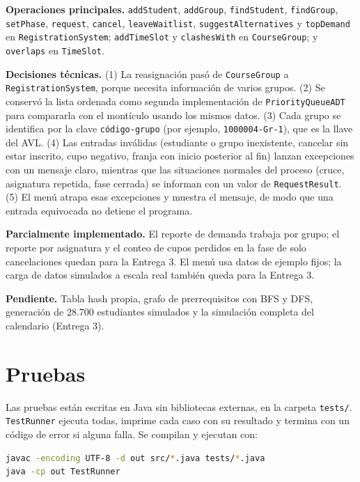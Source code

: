 \documentclass[conference]{IEEEtran}
\begin{document}
\textbf{Operaciones principales.} \texttt{addStudent}, \texttt{addGroup}, \texttt{findStudent}, \texttt{findGroup}, \texttt{setPhase}, \texttt{request}, \texttt{cancel}, \texttt{leaveWaitlist}, \texttt{suggestAlternatives} y \texttt{topDemand} en \texttt{RegistrationSystem}; \texttt{addTimeSlot} y \texttt{clashesWith} en \texttt{CourseGroup}; y \texttt{overlaps} en \texttt{TimeSlot}.

\textbf{Decisiones técnicas.} (1) La reasignación pasó de \texttt{CourseGroup} a \texttt{RegistrationSystem}, porque necesita información de varios grupos. (2) Se conservó la lista ordenada como segunda implementación de \texttt{PriorityQueueADT} para compararla con el montículo usando los mismos datos. (3) Cada grupo se identifica por la clave \texttt{código-grupo} (por ejemplo, \texttt{1000004-Gr-1}), que es la llave del AVL. (4) Las entradas inválidas (estudiante o grupo inexistente, cancelar sin estar inscrito, cupo negativo, franja con inicio posterior al fin) lanzan excepciones con un mensaje claro, mientras que las situaciones normales del proceso (cruce, asignatura repetida, fase cerrada) se informan con un valor de \texttt{RequestResult}. (5) El menú atrapa esas excepciones y muestra el mensaje, de modo que una entrada equivocada no detiene el programa.

\textbf{Parcialmente implementado.} El reporte de demanda trabaja por grupo; el reporte por asignatura y el conteo de cupos perdidos en la fase de solo cancelaciones quedan para la Entrega 3. El menú usa datos de ejemplo fijos; la carga de datos simulados a escala real también queda para la Entrega 3.

\textbf{Pendiente.} Tabla hash propia, grafo de prerrequisitos con BFS y DFS, generación de 28.700 estudiantes simulados y la simulación completa del calendario (Entrega 3).


\section{Pruebas}

Las pruebas están escritas en Java sin bibliotecas externas, en la carpeta \texttt{tests/}. \texttt{TestRunner} ejecuta todas, imprime cada caso con su resultado y termina con un código de error si alguna falla. Se compilan y ejecutan con:
\begin{lstlisting}[language=bash,numbers=none]
javac -encoding UTF-8 -d out src/*.java tests/*.java
java -cp out TestRunner
\end{lstlisting}
\end{document}
